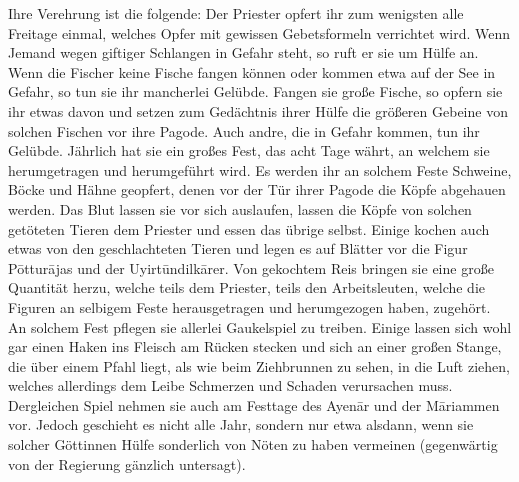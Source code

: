 \documentclass{article}
\begin{document}
Ihre Verehrung ist die folgende: Der Priester opfert ihr zum wenigsten alle Freitage einmal, welches Opfer mit gewissen Gebetsformeln verrichtet wird. Wenn Jemand wegen giftiger Schlangen in Gefahr steht, so ruft er sie um Hülfe an. Wenn die Fischer keine Fische fangen können oder kommen etwa auf der See in Gefahr, so tun sie ihr mancherlei Gelübde. Fangen sie große Fische, so opfern sie ihr etwas davon und setzen zum Gedächtnis ihrer Hülfe die größeren Gebeine von solchen Fischen vor ihre Pagode. Auch andre, die in Gefahr kommen, tun ihr Gelübde. Jährlich hat sie ein großes Fest, das acht Tage währt, an welchem sie herumgetragen und herumgeführt wird. Es werden ihr an solchem Feste Schweine, Böcke und Hähne geopfert, denen vor der Tür ihrer Pagode die Köpfe abgehauen werden. Das Blut lassen sie vor sich auslaufen, lassen die Köpfe von solchen getöteten Tieren dem Priester und essen das übrige selbst. Einige kochen auch etwas von den geschlachteten Tieren und legen es auf Blätter vor die Figur P\={o}ttur\={a}jas und der Uyirt\={u}ndilk\={a}rer. Von gekochtem Reis bringen sie eine große Quantität herzu, welche teils dem Priester, teils den Arbeitsleuten, welche die Figuren an selbigem Feste herausgetragen und herumgezogen haben, zugehört. An solchem Fest pflegen sie allerlei Gaukelspiel zu treiben. Einige lassen sich wohl gar einen Haken ins Fleisch am Rücken stecken und sich an einer großen Stange, die über einem Pfahl liegt, als wie beim Ziehbrunnen zu sehen, in die Luft ziehen, welches allerdings dem Leibe Schmerzen und Schaden verursachen muss. Dergleichen Spiel nehmen sie auch am Festtage des Ayen\={a}r und der M\={a}riammen vor. Jedoch geschieht es nicht alle Jahr, sondern nur etwa alsdann, wenn sie solcher Göttinnen Hülfe sonderlich von Nöten zu haben vermeinen (gegenwärtig von der Regierung gänzlich untersagt).
\end{document}
